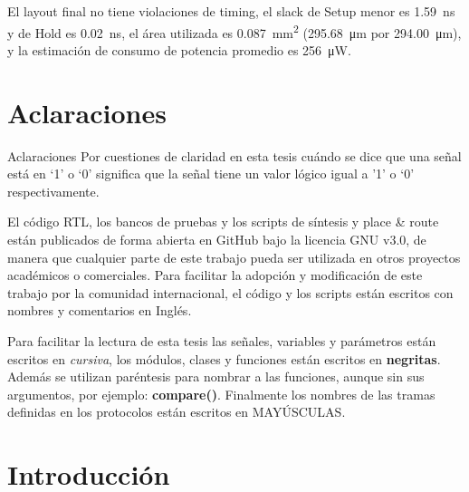 \documentclass[a4paper, twoside, 11pt]{report}
\begin{document}
El layout final no tiene violaciones de timing, el slack de Setup menor es \SI{1,59}{\nano\second} y de Hold es \SI{0,02}{\nano\second}, el área utilizada es \SI{0,087}{\milli\meter\squared} (\SI{295,68}{\micro\meter} por \SI{294,00}{\micro\meter}), y la estimación de consumo de potencia promedio es \SI{256}{\micro\watt}.


\FloatBarrier
\chapter*{Aclaraciones}

Aclaraciones
Por cuestiones de claridad en esta tesis cuándo se dice que una señal está en ‘1’ o ‘0’ significa que la señal tiene un valor lógico igual a '1' o ‘0’ respectivamente.

El código RTL, los bancos de pruebas y los scripts de síntesis y place \& route están publicados de forma abierta en GitHub bajo la licencia GNU v3.0, de manera que cualquier parte de este trabajo pueda ser utilizada en otros proyectos académicos o comerciales. Para facilitar la adopción y modificación de este trabajo por la comunidad internacional, el código y los scripts están escritos con nombres y comentarios en Inglés.

Para facilitar la lectura de esta tesis las señales, variables y parámetros están escritos en \textit{cursiva},  los módulos, clases y funciones están escritos en \textbf{negritas}. Además se utilizan paréntesis para nombrar a las funciones, aunque sin sus argumentos, por ejemplo: \textbf{compare()}. Finalmente los nombres de las tramas definidas en los protocolos están escritos en MAYÚSCULAS.

\newpage
\tableofcontents


\FloatBarrier
\chapter{Introducción}
\end{document}
